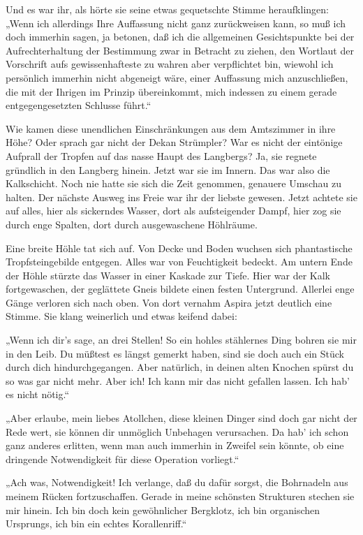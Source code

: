 Und es war ihr, als hörte sie seine etwas gequetschte Stimme
heraufklingen: „Wenn ich allerdings Ihre Auffassung nicht ganz
zurückweisen kann, so muß ich doch immerhin sagen, ja betonen, daß
ich die allgemeinen Gesichtspunkte bei der Aufrechterhaltung der
Bestimmung zwar in Betracht zu ziehen, den Wortlaut der Vorschrift
aufs gewissenhafteste zu wahren aber verpflichtet bin, wiewohl ich
persönlich immerhin nicht abgeneigt wäre, einer Auffassung mich
anzuschließen, die mit der Ihrigen im Prinzip übereinkommt, mich
indessen zu einem gerade entgegengesetzten Schlusse führt.“

Wie kamen diese unendlichen Einschränkungen aus dem Amtszimmer in
ihre Höhe? Oder sprach gar nicht der Dekan Strümpler? War es nicht
der eintönige Aufprall der Tropfen auf das nasse Haupt des
Langbergs? Ja, sie regnete gründlich in den Langberg hinein. Jetzt
war sie im Innern. Das war also die Kalkschicht. Noch nie hatte sie
sich die Zeit genommen, genauere Umschau zu halten. Der nächste
Ausweg ins Freie war ihr der liebste gewesen. Jetzt achtete sie auf
alles, hier als sickerndes Wasser, dort als aufsteigender Dampf,
hier zog sie durch enge Spalten, dort durch ausgewaschene
Höhlräume.

Eine breite Höhle tat sich auf. Von Decke und Boden wuchsen sich
phantastische Tropfsteingebilde entgegen. Alles war von
Feuchtigkeit bedeckt. Am untern Ende der Höhle stürzte das Wasser
in einer Kaskade zur Tiefe. Hier war der Kalk fortgewaschen, der
geglättete Gneis bildete einen festen Untergrund. Allerlei enge
Gänge verloren sich nach oben. Von dort vernahm Aspira jetzt
deutlich eine Stimme. Sie klang weinerlich und etwas keifend
dabei:

„Wenn ich dir's sage, an drei Stellen! So ein hohles stählernes
Ding bohren sie mir in den Leib. Du müßtest es längst gemerkt
haben, sind sie doch auch ein Stück durch dich hindurchgegangen.
Aber natürlich, in deinen alten Knochen spürst du so was gar nicht
mehr. Aber ich! Ich kann mir das nicht gefallen lassen. Ich hab' es
nicht nötig.“

„Aber erlaube, mein liebes Atollchen, diese kleinen Dinger sind
doch gar nicht der Rede wert, sie können dir unmöglich Unbehagen
verursachen. Da hab' ich schon ganz anderes erlitten, wenn man auch
immerhin in Zweifel sein könnte, ob eine dringende Notwendigkeit
für diese Operation vorliegt.“

„Ach was, Notwendigkeit! Ich verlange, daß du dafür sorgst, die
Bohrnadeln aus meinem Rücken fortzuschaffen. Gerade in meine
schönsten Strukturen stechen sie mir hinein. Ich bin doch kein
gewöhnlicher Bergklotz, ich bin organischen Ursprungs, ich bin ein
echtes Korallenriff.“

